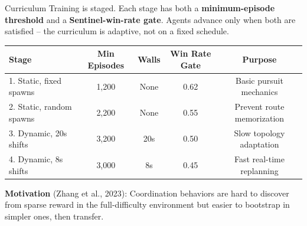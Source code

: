 \documentclass[aspectratio=169,11pt]{beamer}
\begin{document}
\begin{frame}{Curriculum}
Training is staged. Each stage has both a \textbf{minimum-episode threshold} and a \textbf{Sentinel-win-rate gate}. Agents advance only when both are satisfied -- the curriculum is adaptive, not on a fixed schedule.

\vspace{6pt}
\begin{center}
\begin{tabular}{@{}lcccc@{}}
\toprule
\textbf{Stage} & \textbf{Min Episodes} & \textbf{Walls} & \textbf{Win Rate Gate} & \textbf{Purpose} \\
\midrule
1. Static, fixed spawns & 1,200 & None & 0.62 & Basic pursuit mechanics \\
2. Static, random spawns & 2,200 & None & 0.55 & Prevent route memorization \\
3. Dynamic, 20s shifts & 3,200 & 20s & 0.50 & Slow topology adaptation \\
4. Dynamic, 8s shifts & 3,000 & 8s & 0.45 & Fast real-time replanning \\
\bottomrule
\end{tabular}
\end{center}

\vspace{6pt}
\textbf{Motivation} (Zhang et al., 2023): Coordination behaviors are hard to discover from sparse reward in the full-difficulty environment but easier to bootstrap in simpler ones, then transfer.
\end{frame}
\end{document}
